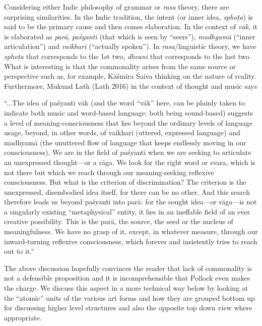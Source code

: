 Considering either Indic philosophy of grammar or \textsl{rasa} theory, there are surprising similarities. In the Indic tradition, the intent (or inner idea, \textsl{sphoṭa}) is said to be the primary cause and then comes elaboration. In the context of \textsl{vāk}, it is elaborated as \textsl{parā}, \textsl{paśyantī} (that which is seen by “seers”), \textsl{madhyamā} (“inner articulation”) and \textsl{vaikharī} (“actually spoken”). In \textsl{rasa}/linguistic theory, we have \textsl{sphoṭa} that corresponds to the 1st two, \textsl{dhvani} that corresponds to the last two. What is interesting is that the commonality arises from the same source or perspective such as, for example, Kāśmīra Śaiva thinking on the nature of reality. Furthermore, Mukund Lath (Lath 2016) in the context of thought and music says 

\begin{myquote}
“...The idea of paśyantī vāk (and the word “vāk” here, can be plainly taken to indicate both music and word-based language: both being sound-based) suggests a level of meaning-consciousness that lies beyond the ordinary levels of language usage, beyond, in other words, of vaikharī (uttered, expressed language) and madhyamā (the unuttered flow of language that keeps endlessly moving in our consciousness). We are in the field of paśyantī when we are seeking to articulate an unexpressed thought—or a rāga. We look for the right word or svara, which is not there but which we reach through our meaning-seeking reflexive consciousness. But what is the criterion of discrimination? The criterion is the unexpressed, disembodied idea itself, for there can be no other. And this search therefore leads us beyond paśyantī into parā: for the sought idea—or rāga—is not a singularly existing “metaphysical” entity, it lies in an ineffable field of an ever creative possibility. This is the parā, the source, the seed or the nucleus of meaningfulness. We have no grasp of it, except, in whatever measure, through our inward-turning reflexive consciousness, which forever and insistently tries to reach out to it.”
\end{myquote}

The above discussion hopefully convinces the reader that lack of commonality is not a defensible proposition and it is incomprehensible that Pollock even makes the charge. We discuss this aspect in a more technical way below by looking at the “atomic” units of the various art forms and how they are grouped bottom up for discussing higher level structures and also the opposite top down view where appropriate.

